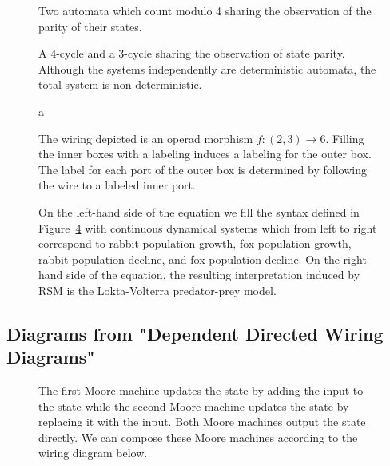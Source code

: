\begin{figure}[h]
	\centering
	\caption{Two automata which
count modulo 4 sharing the
observation of the parity of their
states.}
	\label{fig:rsm-automata-rs}
\end{figure}


\begin{figure}[h]
	\centering
	\caption{A 4-cycle and a 3-cycle
sharing the observation of state
parity. Although the systems
independently are deterministic
automata, the total system is
non-deterministic.}
	\label{fig:rsm-automata-rs2}
\end{figure}

\begin{figure}[h]
	\centering
	\caption{a}
	\label{fig:operad}
\end{figure}

\begin{figure}[h]
	\centering
	\caption{The wiring depicted is an operad morphism $f: (2, 3) \to 6$. Filling the inner boxes with a labeling induces a labeling for the outer box. The label for each port of the outer box is determined by following the wire to a labeled inner port.}
	\label{fig:rsm-CDS-total}
\end{figure}


\begin{figure}[h]
	\centering
	\caption{On the left-hand side of the equation we fill the syntax defined in  Figure~\ref{fig:rsm-CDS-total} with continuous dynamical systems which from left to right correspond to rabbit population growth, fox population growth, rabbit population decline, and fox population decline. On the right-hand side of the equation, the resulting interpretation induced by RSM is the Lokta-Volterra predator-prey model.}
	\label{fig:rsm-CDS-total-filled}
\end{figure}


\subsection{Diagrams from "Dependent Directed Wiring Diagrams"}

\begin{figure}[h]
	\centering
	\caption{The first Moore machine updates the state by adding the input to the state while the second Moore machine
updates the state by replacing it with the input. Both Moore machines output the state directly. We can
compose these Moore machines according to the wiring diagram below.}
	\label{fig:dwd-loop}
\end{figure}


